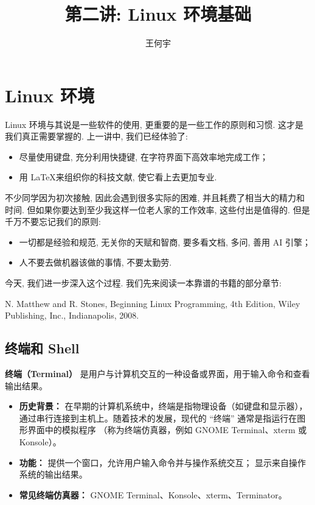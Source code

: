 \documentclass[a4paper]{ctexart}
\title{第二讲: Linux 环境基础}
\author{王何宇}
\date{}
\begin{document}
\maketitle
\pagestyle{empty}

\section{Linux 环境}

Linux 环境与其说是一些软件的使用, 更重要的是一些工作的原则和习惯. 这才是我们真正需要掌握的.
上一讲中, 我们已经体验了:

\begin{itemize}
\item 尽量使用键盘, 充分利用快捷键, 在字符界面下高效率地完成工作；
\item 用 \LaTeX 来组织你的科技文献, 使它看上去更加专业.  
\end{itemize}

不少同学因为初次接触, 因此会遇到很多实际的困难, 并且耗费了相当大的精力和时间.
但如果你要达到至少我这样一位老人家的工作效率, 这些付出是值得的. 但是千万不要忘记我们的原则:

\begin{itemize}
\item 一切都是经验和规范, 无关你的天赋和智商, 要多看文档, 多问, 善用 AI 引擎；
\item 人不要去做机器该做的事情, 不要太勤劳.
\end{itemize}

今天, 我们进一步深入这个过程. 我们先来阅读一本靠谱的书籍的部分章节:

N. Matthew and R. Stones, Beginning Linux Programming,
4th Edition, Wiley Publishing, Inc.,
Indianapolis, 2008\cite{matthew2008beginning}.



\subsection{终端和 Shell}

\textbf{终端（Terminal）} 是用户与计算机交互的一种设备或界面，用于输入命令和查看输出结果。

\begin{itemize}
    \item \textbf{历史背景：} 在早期的计算机系统中，终端是指物理设备（如键盘和显示器），
    通过串行连接到主机上。随着技术的发展，现代的 ``终端'' 通常是指运行在图形界面中的模拟程序
    （称为终端仿真器，例如 GNOME Terminal、xterm 或 Konsole）。
    \item \textbf{功能：} 提供一个窗口，允许用户输入命令并与操作系统交互；
    显示来自操作系统的输出结果。
    \item \textbf{常见终端仿真器：} GNOME Terminal、Konsole、xterm、Terminator。
\end{itemize}
\end{document}
